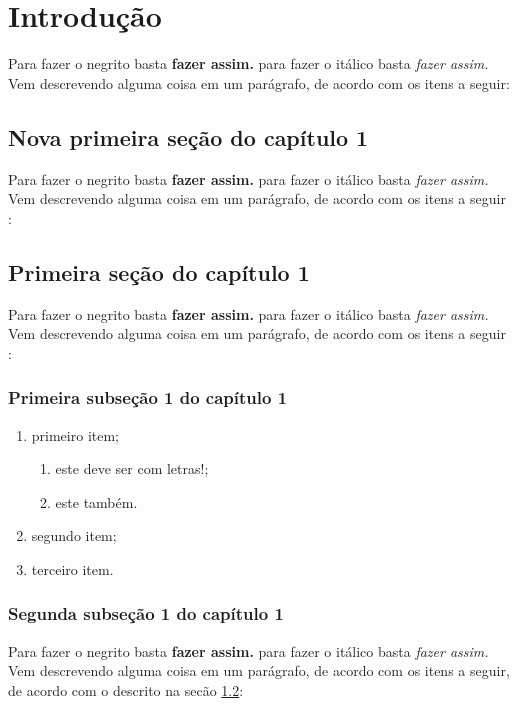 \chapter{Introdução}
Para fazer o negrito basta \textbf{fazer assim.} para fazer o itálico basta \textit{fazer assim.} Vem descrevendo alguma coisa em um parágrafo, de acordo com os itens a seguir:

\section{Nova primeira seção do capítulo 1}

Para fazer o negrito basta \textbf{fazer assim.} para fazer o itálico basta \textit{fazer assim.} Vem descrevendo alguma coisa em um parágrafo, de acordo com os itens a seguir \cite{bueno2020}:

\section{Primeira seção do capítulo 1}\label{primeira-secao}

Para fazer o negrito basta \textbf{fazer assim.} para fazer o itálico basta \textit{fazer assim.} Vem descrevendo alguma coisa em um parágrafo, de acordo com os itens a seguir \cite{meira2021}:

\subsection{Primeira subseção 1 do capítulo 1}

\begin{enumerate}
    \item primeiro item;
    \begin{enumerate}
        \item este deve ser com letras!;
        \item este também.
    \end{enumerate}
    \item segundo item;
    \item terceiro item.
\end{enumerate}

\subsection{Segunda subseção 1 do capítulo 1}
Para fazer o negrito basta \textbf{fazer assim.} para fazer o itálico basta \textit{fazer assim.} Vem descrevendo alguma coisa em um parágrafo, de acordo com os itens a seguir, de acordo com o descrito na secão \ref{primeira-secao}:
